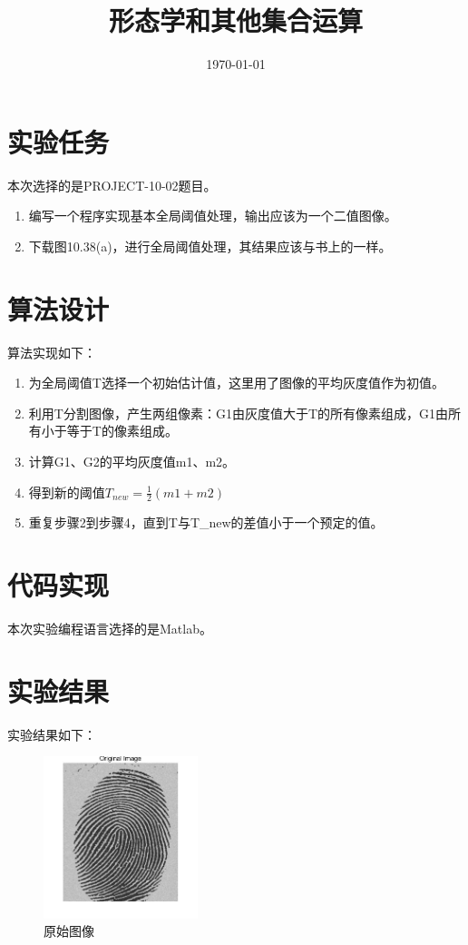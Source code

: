 \documentclass{../source/Experiment}
\title{形态学和其他集合运算}
\date{\today}
\begin{document}
    \makecover
    \section{实验任务}

        本次选择的是PROJECT-10-02题目。

        \begin{enumerate}
            \item 编写一个程序实现基本全局阈值处理，输出应该为一个二值图像。
            \item 下载图10.38(a)，进行全局阈值处理，其结果应该与书上的一样。
        \end{enumerate}

    \section{算法设计}
        算法实现如下：

        \begin{enumerate}
            \item 为全局阈值T选择一个初始估计值，这里用了图像的平均灰度值作为初值。
            \item 利用T分割图像，产生两组像素：G1由灰度值大于T的所有像素组成，G1由所有小于等于T的像素组成。
            \item 计算G1、G2的平均灰度值m1、m2。
            \item 得到新的阈值$\displaystyle T_{new} = \frac{1}{2}(m1+m2)$
            \item 重复步骤2到步骤4，直到T与T\_new的差值小于一个预定的值。
        \end{enumerate}


    \section{代码实现}
        本次实验编程语言选择的是Matlab。

        

    \section{实验结果}
        实验结果如下：

        \begin{figure}[H]
            \centering
            \includegraphics[width = 0.4\textwidth]{第五次/lab5-1.jpg}
            \caption{原始图像}
        \end{figure}
\end{document}
